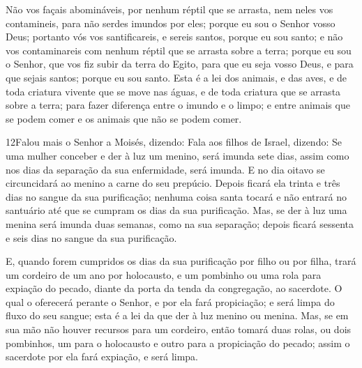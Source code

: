 Não vos façais abomináveis, por nenhum réptil que se arrasta, nem
neles vos contamineis, para não serdes imundos por eles;
porque eu sou o Senhor vosso Deus; portanto vós vos
santificareis, e sereis santos, porque eu sou santo; e não vos
contaminareis com nenhum réptil que se arrasta sobre a terra;
porque eu sou o Senhor, que vos fiz subir da terra do Egito,
para que eu seja vosso Deus, e para que sejais santos; porque eu sou
santo. Esta é a lei dos animais, e das aves, e de toda
criatura vivente que se move nas águas, e de toda criatura que se
arrasta sobre a terra; para fazer diferença entre o imundo e
o limpo; e entre animais que se podem comer e os animais que não se
podem comer.

\medskip

\lettrine{12} Falou mais o Senhor a Moisés, dizendo: Fala
aos filhos de Israel, dizendo: Se uma mulher conceber e der à luz um
menino, será imunda sete dias, assim como nos dias da separação da
sua enfermidade, será imunda. E no dia oitavo se circuncidará ao
menino a carne do seu prepúcio. Depois ficará ela trinta e três
dias no sangue da sua purificação; nenhuma coisa santa tocará e não
entrará no santuário até que se cumpram os dias da sua purificação.
Mas, se der à luz uma menina será imunda duas semanas, como na
sua separação; depois ficará sessenta e seis dias no sangue da sua
purificação.

E, quando forem cumpridos os dias da sua purificação por filho ou
por filha, trará um cordeiro de um ano por holocausto, e um pombinho
ou uma rola para expiação do pecado, diante da porta da tenda da
congregação, ao sacerdote. O qual o oferecerá perante o Senhor,
e por ela fará propiciação; e será limpa do fluxo do seu sangue;
esta é a lei da que der à luz menino ou menina. Mas, se em sua
mão não houver recursos para um cordeiro, então tomará duas rolas,
ou dois pombinhos, um para o holocausto e outro para a propiciação
do pecado; assim o sacerdote por ela fará expiação, e será limpa.

\medskip

